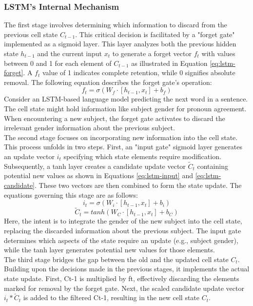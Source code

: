 \subsubsection{LSTM's Internal Mechanism}
The first stage involves determining which information to discard from the previous cell state $C_{t-1}$. This critical decision is facilitated by a "forget gate" implemented as a sigmoid layer. This layer analyzes both the previous hidden state $h_{t-1}$ and the current input $x_t$ to generate a forget vector $f_t$ with values between 0 and 1 for each element of $C_{t-1}$ as illustrated in Equation \ref{eq:lstm-forget}. A $f_t$ value of 1 indicates complete retention, while 0 signifies absolute removal.
The following equation describes the forget gate's operation:
\begin{equation} \label{eq:lstm-forget}
    f_t = \sigma(W_f \cdot [h_{t-1}, x_t] + b_f)
\end{equation}
Consider an LSTM-based language model predicting the next word in a sentence. The cell state might hold information like subject gender for pronoun agreement. When encountering a new subject, the forget gate activates to discard the irrelevant gender information about the previous subject.\\
The second stage focuses on incorporating new information into the cell state. This process unfolds in two steps. First, an "input gate" sigmoid layer generates an update vector $i_t$ specifying which state elements require modification. Subsequently, a tanh layer creates a candidate update vector $\tilde{C}_t$ containing potential new values as shown in Equations \ref{eq:lstm-input} and \ref{eq:lstm-candidate}. These two vectors are then combined to form the state update.
The equations governing this stage are as follows:
\begin{equation} \label{eq:lstm-input}
    i_t = \sigma(W_i \cdot [h_{t-1}, x_t] + b_i)
\end{equation}
\begin{equation} \label{eq:lstm-candidate}
    \tilde{C}_t = tanh(W_C \cdot [h_{t-1}, x_t] + b_C)
\end{equation}
Here, the intent is to integrate the gender of the new subject into the cell state, replacing the discarded information about the previous subject. The input gate determines which aspects of the state require an update (e.g., subject gender), while the tanh layer generates potential new values for those elements.\\
The third stage bridges the gap between the old and the updated cell state $C_t$. Building upon the decisions made in the previous stages, it implements the actual state update. First, Ct-1 is multiplied by ft, effectively discarding the elements marked for removal by the forget gate. Next, the scaled candidate update vector $i_t * \tilde{C}_t$ is added to the filtered Ct-1, resulting in the new cell state $C_t$.\\
